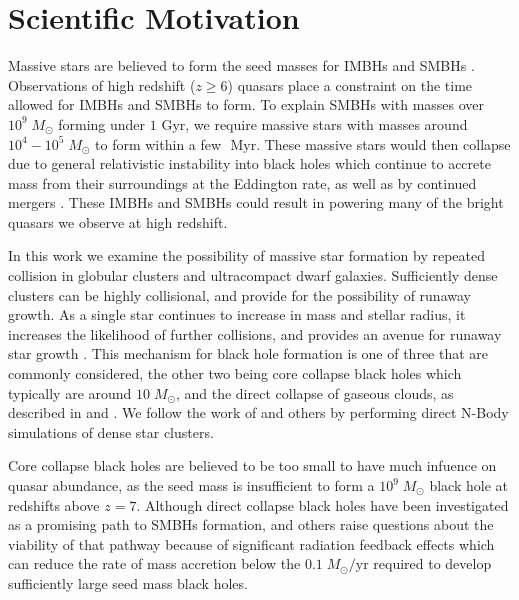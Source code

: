 \documentclass[preprint1]{aastex}
\title{}
\author{Elias Rubin}
\newcommand\Msun{\; M_\odot}
\newcommand\Myr{\mbox{ Myr}}
\newcommand\Gyr{\mbox{ Gyr}}
\numberwithin{equation}{section}
\begin{document}
\section{Scientific Motivation} \label{Intro}
Massive stars are believed to form the seed masses for \acp{IMBH} and \acp{SMBH} \citep{2003Bromm, 2013Hosokawa}. Observations of high redshift ($z \ge 6$) quasars place a constraint on the time allowed for \acp{IMBH} and \acp{SMBH} to form.  To explain \acp{SMBH} with masses over $10^9 \Msun$ forming under $1 \Gyr$, we require massive stars with masses around $10^4 - 10^5 \Msun$ to form within a few $\Myr$. These massive stars would then collapse due to general relativistic instability \citep{1964Chandrasekhar} into black holes which continue to accrete mass from their surroundings at the Eddington rate, as well as by continued mergers \citep{2015Katz, 2016Latif}. These \acp{IMBH} and \acp{SMBH} could result in powering many of the bright quasars we observe at high redshift.

In this work we examine the possibility of massive star formation by repeated collision in globular clusters and ultracompact dwarf galaxies. Sufficiently dense clusters can be highly collisional, and provide for the possibility of runaway growth. As a single star continues to increase in mass and stellar radius, it increases the likelihood of further collisions, and provides an avenue for runaway star growth \citep{2015Katz}. This mechanism for black hole formation is one of three that are commonly considered, the other two being core collapse black holes which typically are around $10 \Msun$, and the direct collapse of gaseous clouds, as described in \citet{2003Bromm} and \citet{2016Latif}. We follow the work of \citet{2004SPZ} and others by performing direct N-Body simulations of dense star clusters.

Core collapse black holes are believed to be too small to have much infuence on quasar abundance, as the seed mass is insufficient to form a $10^9 \Msun$ black hole at redshifts above $z = 7$.  Although direct collapse black holes have been investigated as a promising path to \acp{SMBH} formation, \citet{2016Latif} and others raise questions about the viability of that pathway because of significant radiation feedback effects which can reduce the rate of mass accretion below the $0.1 \Msun/\mbox{yr}$ required to develop sufficiently large seed mass black holes.
\end{document}
